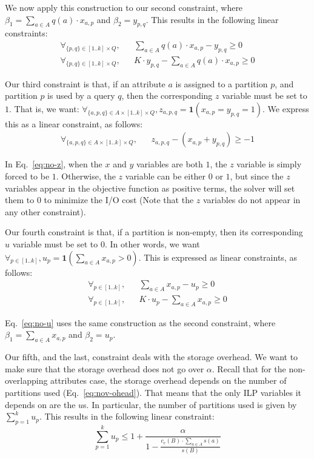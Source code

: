 We now apply this construction to our second constraint, where
$\beta_1=\sum_{a\in A} q(a)\cdot x_{a,p}$ and $\beta_2=y_{p,q}$. This results
in the following linear constraints:
\begin{eqnarray}
\forall_{\{p,q\}\in [1..k]\times Q}, 
    &&  \sum_{a\in A} q(a)\cdot x_{a,p} - y_{p,q} \geq 0 \nonumber\\
\forall_{\{p,q\}\in [1..k]\times Q}, 
    &&  K\cdot y_{p,q} - \sum_{a\in A} q(a)\cdot x_{a,p}  \geq 0 
\end{eqnarray}

Our third constraint is that, if an attribute $a$ is assigned to a partition
$p$, and partition $p$ is used by a query $q$, then the corresponding $z$
variable must be set to $1$. That is, we want: $\forall_{\{a,p,q\}\in A\times
[1..k]\times Q}, z_{a,p,q}=\mathbf{1}(x_{a,p} = y_{p,q} = 1)$. We express this
as a linear  constraint, as follows:
\begin{eqnarray}
\forall_{\{a,p,q\}\in A\times [1..k]\times Q},
    && z_{a,p,q} - (x_{a,p} + y_{p,q}) \geq -1\label{eq:no-z}
\end{eqnarray}

In Eq.~\ref{eq:no-z}, when the $x$ and $y$ variables are both $1$, the  $z$
variable is simply forced to be $1$. Otherwise, the $z$ variable can be either
$0$ or $1$, but since the $z$ variables appear in the objective function as
positive terms, the solver will set them to $0$ to minimize the I/O cost (Note
that the $z$ variables do not appear in any other constraint). 

Our fourth constraint is that, if a partition is non-empty, then its
corresponding $u$ variable must be set to $0$. In other words,  we want
$\forall_{p\in[1..k]}, u_p = \mathbf{1}(\sum_{a\in A} x_{a,p}>0)$. This is
expressed as linear constraints, as follows:
\begin{eqnarray}
\forall_{p\in[1..k]},
    && \sum_{a\in A} x_{a,p} - u_p \geq 0 \nonumber\\
\forall_{p\in[1..k]},
    && K\cdot u_p - \sum_{a\in A} x_{a,p} \geq 0 \label{eq:no-u}
\end{eqnarray}

Eq.~\ref{eq:no-u} uses the same construction as the second constraint, where
$\beta_1=\sum_{a\in A} x_{a,p}$ and $\beta_2=u_p$.

Our fifth, and the last, constraint deals with the storage overhead. We want to
 make sure that the storage overhead does not go over $\alpha$. Recall that
for  the non-overlapping attributes case, the storage overhead depends on the
number of partitions used (Eq.~\ref{eq:nov-ohead}). That means that the only 
ILP variables it depends on are the $u$s. In particular, the number of
partitions used is given by $\sum_{p=1}^{k} u_p$. This results in the
following linear constraint:
\begin{equation}
\sum_{p=1}^{k} u_p \leq 1 + \frac{\alpha}
  {1-\frac{c_e(B)\cdot \sum_{a\in A} s(a)}{s(B)}}
\end{equation}

